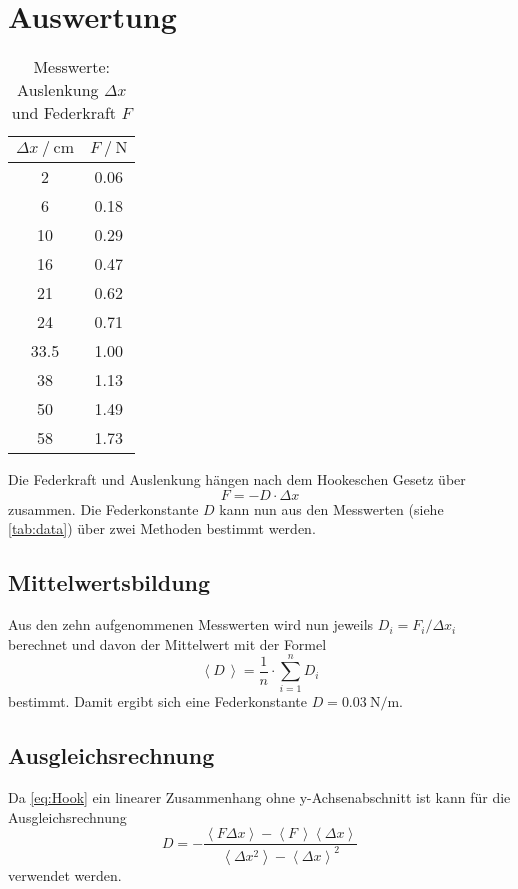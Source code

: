\section{Auswertung}
\label{sec:Auswertung}
\begin{table}
  \centering
  \caption{Messwerte: Auslenkung $\Delta x $ und Federkraft $F$}
  \label{tab:data}
  \begin{tabular}{c c}
    \toprule 
    $\Delta x \:/\: \si{\centi\meter}$ & $F \:/\: \si{\newton}$ \\ 
    \midrule 
    2 & 0.06 \\
    6 & 0.18 \\
    10 & 0.29 \\
    16 & 0.47 \\
    21 & 0.62 \\
    24 & 0.71 \\
    33.5 & 1.00 \\
    38 & 1.13 \\
    50 & 1.49 \\
    58 & 1.73 \\ 
    \bottomrule
  \end{tabular}
\end{table} 
\noindent Die Federkraft und Auslenkung hängen nach dem Hookeschen Gesetz über
\begin{equation}
  \label{eq:Hook}
  F = - D \cdot \Delta x
\end{equation}
zusammen.
Die Federkonstante $D$ kann nun aus den Messwerten (siehe \autoref{tab:data}) über zwei Methoden bestimmt werden.

\newpage

\subsection{Mittelwertsbildung}
Aus den zehn aufgenommenen Messwerten wird nun jeweils $D_i = F_i / \Delta x_i$ berechnet und davon der Mittelwert mit der Formel
\begin{equation}
  \label{eq:Mittelwert}
  \left< D \, \right> = \frac{1}{n} \cdot \sum_{i=1}^{n} D_i
\end{equation}
bestimmt. Damit ergibt sich eine Federkonstante $D = \SI{0.03}{\newton\per\meter}$.

\subsection{Ausgleichsrechnung}

Da \autoref{eq:Hook} ein linearer Zusammenhang ohne y-Achsenabschnitt ist kann für die Ausgleichsrechnung
\begin{equation}
  \label{eq:Lin-Ausgleich}
  D = - \frac
  {\left< F \Delta x \right> - \left< F \, \right> \left< \Delta x \right>}
  {\left< \Delta x^2 \right> - \left< \Delta x \right> ^2}
\end{equation}
verwendet werden.

